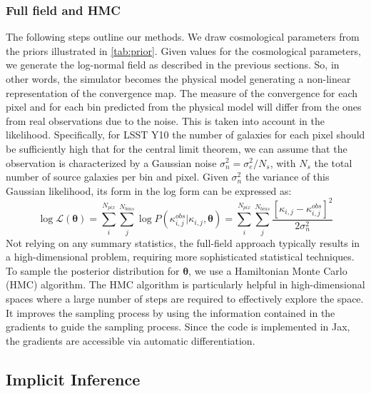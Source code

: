 \documentclass{aa}
\begin{document}
\subsubsection{Full field and HMC}
The following steps outline our methods. We draw cosmological parameters from the priors illustrated in \autoref{tab:prior}. Given values for the cosmological parameters, we generate the log-normal field as described in the previous sections. So, in other words, the simulator becomes the physical model generating a non-linear representation of the convergence map. The measure of the convergence for each pixel and for each bin predicted from the physical model will differ from the ones from real observations due to the noise.  This is taken into account in the likelihood. Specifically, for LSST Y10 the number of galaxies for each pixel should be sufficiently high that for the central limit theorem, we can assume that the observation is characterized by a Gaussian noise $\sigma_n^2=\sigma_e^2/N_s$, with $N_s$ the total number of source galaxies per bin and pixel. Given $\sigma_n^2$ the variance of this Gaussian likelihood, its form in the log form can be expressed as:
\begin{equation}
    \log{\mathcal{L}}(\bm{\theta})=
    \sum_i^{N_{pix}} \sum_{j}^{N_{bins}} \log{P(\kappa^{obs}_{i,j}|\kappa_{i,j},\bm{\theta})}
    =\sum_i^{N_{pix}} \sum_{j}^{N_{bins}}\frac{[\kappa_{i,j}-\kappa^{obs}_{i,j}]^2}{2\sigma_n^2}
\end{equation}
Not relying on any summary statistics, the full-field approach typically results in a high-dimensional problem, requiring more sophisticated statistical techniques. To sample the posterior distribution for $\bm{\theta}$, we use a Hamiltonian Monte Carlo (HMC) algorithm. The HMC algorithm is particularly helpful in high-dimensional spaces where a large number of steps are required to effectively explore the space. It improves the sampling process by using the information contained in the gradients to guide the sampling process. Since the code is implemented in Jax, the gradients are accessible via automatic differentiation. 
\subsection{Implicit Inference}
\end{document}
